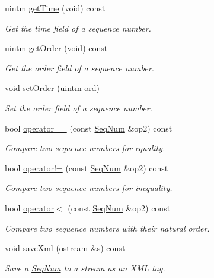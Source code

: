 \begin{DoxyCompactItemize}
uintm \mbox{\hyperlink{class_seq_num_a1f19fed862621e856d70dda65731c94c}{get\+Time}} (void) const
\begin{DoxyCompactList}\small\item\em Get the {\itshape time} field of a sequence number. \end{DoxyCompactList}\item 
uintm \mbox{\hyperlink{class_seq_num_af42e406cdae712585cbfe1e95b2fceb8}{get\+Order}} (void) const
\begin{DoxyCompactList}\small\item\em Get the {\itshape order} field of a sequence number. \end{DoxyCompactList}\item 
void \mbox{\hyperlink{class_seq_num_ad9cd2238d891923c360c7e2df244197c}{set\+Order}} (uintm ord)
\begin{DoxyCompactList}\small\item\em Set the {\itshape order} field of a sequence number. \end{DoxyCompactList}\item 
bool \mbox{\hyperlink{class_seq_num_a11552f9049fa1fcd8ea255d0236c1a2f}{operator==}} (const \mbox{\hyperlink{class_seq_num}{Seq\+Num}} \&op2) const
\begin{DoxyCompactList}\small\item\em Compare two sequence numbers for equality. \end{DoxyCompactList}\item 
bool \mbox{\hyperlink{class_seq_num_a25f1e1917e1070653d4d934593525b97}{operator!=}} (const \mbox{\hyperlink{class_seq_num}{Seq\+Num}} \&op2) const
\begin{DoxyCompactList}\small\item\em Compare two sequence numbers for inequality. \end{DoxyCompactList}\item 
bool \mbox{\hyperlink{class_seq_num_aeb254f95288b456c6554b7950a499705}{operator$<$}} (const \mbox{\hyperlink{class_seq_num}{Seq\+Num}} \&op2) const
\begin{DoxyCompactList}\small\item\em Compare two sequence numbers with their natural order. \end{DoxyCompactList}\item 
void \mbox{\hyperlink{class_seq_num_a31932b829fa851988806afa0d1002c24}{save\+Xml}} (ostream \&s) const
\begin{DoxyCompactList}\small\item\em Save a \mbox{\hyperlink{class_seq_num}{Seq\+Num}} to a stream as an X\+ML tag. \end{DoxyCompactList}\end{DoxyCompactItemize}
